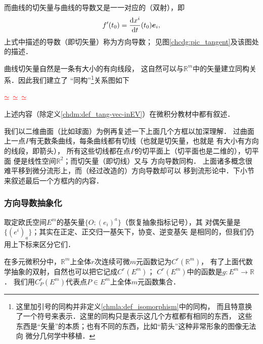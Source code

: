 而曲线的切矢量与曲线的导数又是一一对应的（双射），即
\begin{equation}\label{chdm:eqn_gfv}
    f'(t_0) = \frac{{\rm d} x^i}{{\rm d}t}(t_0)\boldsymbol{e}_i ,
\end{equation}
上式中描述的导数（即切矢量）称为{\kaishu 方向导数}；
见图\ref{chcdg:pic_tangent}及该图处的描述．

曲线切矢量自然是一条有大小的有向线段，
这自然可以与$\mathbb{R}^m$中的矢量建立同构关系．因此我们建立了
“同构”{\footnote{这里加引号的同构并非定义\ref{chmla:def_isomorphism}中的同构，
        而且特意换了一个符号来表示．这里的同构只是表示这几个方框都有相同的东西，
        这些东西是“矢量”的本质；也有不同的东西，比如“箭头”这种非常形象的图像无法向
        微分几何学中移植．}}关系图如下
\begin{center}
     $\color{red}\simeq$
     $\color{red}\simeq$
     $\color{red}\simeq$
\end{center}
上述内容（除定义\ref{chdm:def_tang-vec-inEV}）在微积分教材中都有叙述．

我们以二维曲面（比如球面）为例再复述一下上面几个方框以加深理解．
过曲面上一点$P$有无数条曲线，每条曲线都有切线（也就是切矢量，也就是
有大小有方向的线段，即箭头），
所有这些切线都在点$P$的切平面上（切平面也是二维的），切平面
便是线性空间$\mathbb{R}^2$；而切矢量（即切线）又与
方向导数同构．
上面诸多概念很难平移到微分流形上，而（经过改造的）方向导数却可以
移到流形论中．下小节来叙述最后一个方框内的内容．


\subsubsection{方向导数抽象化}\label{chdm:sec_ed}
取定欧氏空间$E^m$的基矢量$\{O;(e_i)^a\}$（恢复抽象指标记号），其
对偶矢量是$\{(e^i)_a\}$；其实在正定、正交归一基矢下，协变、逆变基矢
是相同的，但我们仍用上下标来区分它们．

在多元微积分中，$\mathbb{R}^m$上全体$r$次连续可微$m$元函数记为$C^r(\mathbb{R}^m)$，
有了上面代数学抽象的双射，自然也可以把它记成$C^r(E^m)$；
$C^r(E^m)$中的函数是$g:E^m \to \mathbb{R}$．
我们用$C^r_P(E^m)$代表点$P\in E^m$上全体$m$元函数集合．

